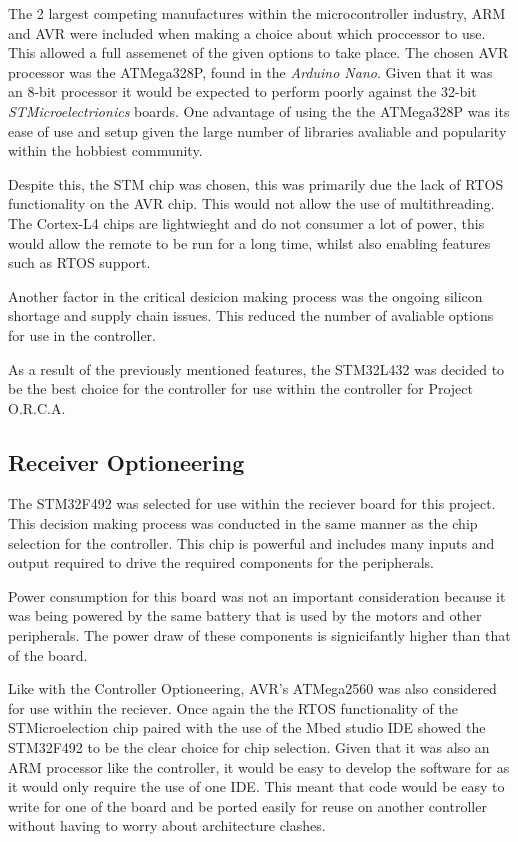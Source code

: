 \documentclass [11pt]{article}
\begin{document}
The 2 largest competing manufactures within the microcontroller industry, ARM and AVR were included when making a choice about which proccessor to use. This allowed a full assemenet of the given options to take place. The chosen AVR processor was the ATMega328P, found in the \textit{Arduino Nano}. Given that it was an 8-bit processor it would be expected to perform poorly against the 32-bit \textit{STMicroelectrionics} boards. One advantage of using the the ATMega328P was its ease of use and setup given the large number of libraries avaliable and popularity within the hobbiest community. 

Despite this, the STM chip was chosen, this was primarily due the lack of RTOS functionality on the AVR chip. This would not allow the use of multithreading. The Cortex-L4 chips are lightwieght and do not consumer a lot of power, this would allow the remote to be run for a long time, whilst also enabling features such as RTOS support. 

Another factor in the critical desicion making process was the ongoing silicon shortage and supply chain issues. This reduced the number of avaliable options for use in the controller.  

As a result of the previously mentioned features, the STM32L432 was decided to be the best choice for the controller for use within the controller for Project O.R.C.A.    

\subsection{Receiver Optioneering}

The STM32F492 was selected for use within the reciever board for this project. This decision making process was conducted in the same manner as the chip selection for the controller. This chip is powerful and includes many inputs and output required to drive the required components for the peripherals.

Power consumption for this board was not an important consideration because it was being powered by the same battery that is used by the motors and other peripherals. The power draw of these components is signicifantly higher than that of the board.

Like with the Controller Optioneering, AVR's ATMega2560 was also considered for use within the reciever. Once again the the RTOS functionality of the STMicroelection  chip paired with the use of the Mbed studio IDE showed the STM32F492 to be the clear choice for chip selection. Given that it was also an ARM processor like the controller, it would be easy to develop the software for as it would only require the use of one IDE. This meant that code would be easy to write for one of the board and be ported easily for reuse on another controller without having to worry about architecture clashes.       
\end{document}
